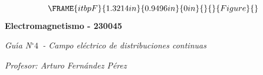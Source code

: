 \documentclass[12pt]{article}
\begin{document}
\begin{center}
\begin{equation*}
\FRAME{itbpF}{1.3214in}{0.9496in}{0in}{}{}{Figure}{\special{language
"Scientific Word";type "GRAPHIC";maintain-aspect-ratio TRUE;display
"USEDEF";valid_file "T";width 1.3214in;height 0.9496in;depth
0in;original-width 1.3552in;original-height 0.9669in;cropleft "0";croptop
"1";cropright "1";cropbottom "0";tempfilename
'R03JBW00.bmp';tempfile-properties "XPR";}}
\end{equation*}%
\textbf{Electromagnetismo - 230045}

\emph{Gu\'{\i}a N}$%
{{}^\circ}%
4$\emph{\ - Campo el\'{e}ctrico de distribuciones continuas}

\textit{Profesor: Arturo Fern\'{a}ndez P\'{e}rez}
\end{center}
\end{document}
